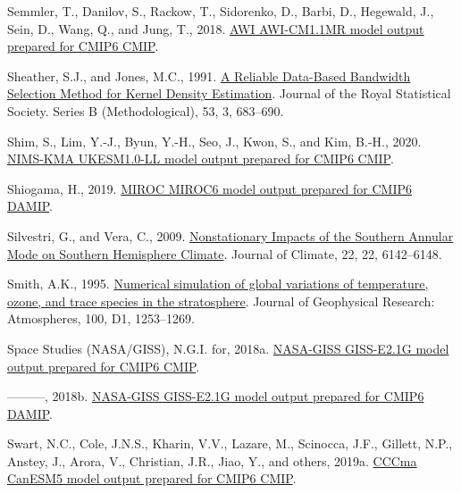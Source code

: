 \documentclass[12pt,oneside]{reedthesis}
\newlength{\cslhangindent}
\newenvironment{CSLReferences}[2] %
 {%
  \setlength{\parindent}{0pt}
  \ifodd #1 \everypar{\setlength{\hangindent}{\cslhangindent}}\ignorespaces\fi
  \ifnum #2 > 0
  \setlength{\parskip}{#2\baselineskip}
  \fi
 }%
 {}
\begin{document}
\begin{CSLReferences}{1}{0}
\leavevmode{}%
Semmler, T., Danilov, S., Rackow, T., Sidorenko, D., Barbi, D., Hegewald, J., Sein, D., Wang, Q., and Jung, T., 2018. \href{https://doi.org/10.22033/ESGF/CMIP6.359}{AWI AWI-CM1.1MR model output prepared for CMIP6 CMIP}.

\leavevmode{}%
Sheather, S.J., and Jones, M.C., 1991. \href{https://www.jstor.org/stable/2345597}{A {Reliable Data-Based Bandwidth Selection Method} for {Kernel Density Estimation}}. Journal of the Royal Statistical Society. Series B (Methodological), 53, 3, 683--690.

\leavevmode{}%
Shim, S., Lim, Y.-J., Byun, Y.-H., Seo, J., Kwon, S., and Kim, B.-H., 2020. \href{https://doi.org/10.22033/ESGF/CMIP6.2245}{NIMS-KMA UKESM1.0-LL model output prepared for CMIP6 CMIP}.

\leavevmode{}%
Shiogama, H., 2019. \href{https://doi.org/10.22033/ESGF/CMIP6.894}{MIROC MIROC6 model output prepared for CMIP6 DAMIP}.

\leavevmode{}%
Silvestri, G., and Vera, C., 2009. \href{https://doi.org/10.1175/2009JCLI3036.1}{Nonstationary {Impacts} of the {Southern Annular Mode} on {Southern Hemisphere Climate}}. Journal of Climate, 22, 22, 6142--6148.

\leavevmode{}%
Smith, A.K., 1995. \href{https://doi.org/10.1029/94JD02395}{Numerical simulation of global variations of temperature, ozone, and trace species in the stratosphere}. Journal of Geophysical Research: Atmospheres, 100, D1, 1253--1269.

\leavevmode{}%
Space Studies (NASA/GISS), N.G.I. for, 2018a. \href{https://doi.org/10.22033/ESGF/CMIP6.1400}{NASA-GISS GISS-E2.1G model output prepared for CMIP6 CMIP}.

\leavevmode{}%
---------, 2018b. \href{https://doi.org/10.22033/ESGF/CMIP6.2062}{NASA-GISS GISS-E2.1G model output prepared for CMIP6 DAMIP}.

\leavevmode{}%
Swart, N.C., Cole, J.N.S., Kharin, V.V., Lazare, M., Scinocca, J.F., Gillett, N.P., Anstey, J., Arora, V., Christian, J.R., Jiao, Y., and others, 2019a. \href{https://doi.org/10.22033/ESGF/CMIP6.1303}{CCCma CanESM5 model output prepared for CMIP6 CMIP}.


\end{CSLReferences}
\end{document}
